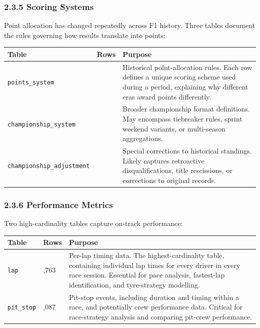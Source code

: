 \documentclass[
]{article}
\begin{document}
\subsubsection{2.3.5 Scoring Systems}\label{scoring-systems}

Point allocation has changed repeatedly across F1 history. Three tables
document the rules governing how results translate into points:

\begin{table}[!h]
\centering\begingroup\fontsize{9}{11}\selectfont

\begin{tabular}[t]{>{\raggedright\arraybackslash}p{4.5cm}>{\raggedright\arraybackslash}p{1.5cm}>{\raggedright\arraybackslash}p{9cm}}
\toprule
Table & Rows & Purpose\\
\midrule
\texttt{points\_system} & 24 & Historical point-allocation rules. Each row defines a unique scoring scheme used during a period, explaining why different eras award points differently.\\
\texttt{championship\_system} & 11 & Broader championship format definitions. May encompass tiebreaker rules, sprint weekend variants, or multi-season aggregations.\\
\texttt{championship\_adjustment} & 3 & Special corrections to historical standings. Likely captures retroactive disqualifications, title rescissions, or corrections to original records.\\
\bottomrule
\end{tabular}
\endgroup{}
\end{table}

\newpage

\subsubsection{2.3.6 Performance Metrics}\label{performance-metrics}

Two high-cardinality tables capture on-track performance:

\begin{table}[!h]
\centering\begingroup\fontsize{9}{11}\selectfont

\begin{tabular}[t]{>{\raggedright\arraybackslash}p{4.5cm}>{\raggedright\arraybackslash}p{1.5cm}>{\raggedright\arraybackslash}p{9cm}}
\toprule
Table & Rows & Purpose\\
\midrule
\texttt{lap} & 741,763 & Per-lap timing data. The highest-cardinality table, containing individual lap times for every driver in every race session. Essential for pace analysis, fastest-lap identification, and tyre-strategy modelling.\\
\texttt{pit\_stop} & 13,087 & Pit-stop events, including duration and timing within a race, and potentially crew performance data. Critical for race-strategy analysis and comparing pit-crew performance.\\
\bottomrule
\end{tabular}
\endgroup{}
\end{table}
\end{document}
